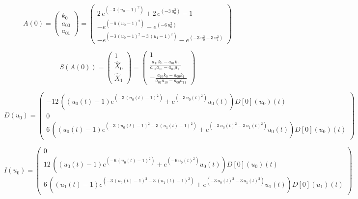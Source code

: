 \documentclass{article}
\begin{document}
\[
  A\left(0\right) = \left(\begin{array}{r}
k_{0} \\
a_{00} \\
a_{01}
\end{array}\right) = \left(\begin{array}{r}
2 \, e^{\left(-3 \, {\left(u_{0} - 1\right)}^{2}\right)} + 2 \, e^{\left(-3 \, u_{0}^{2}\right)} - 1 \\
-e^{\left(-6 \, {\left(u_{0} - 1\right)}^{2}\right)} - e^{\left(-6 \, u_{0}^{2}\right)} \\
-e^{\left(-3 \, {\left(u_{0} - 1\right)}^{2} - 3 \, {\left(u_{1} - 1\right)}^{2}\right)} - e^{\left(-3 \, u_{0}^{2} - 3 \, u_{1}^{2}\right)}
\end{array}\right)
\]

\[
  S\left(A\left(0\right)\right) = \left(\begin{array}{r}
1 \\
\hat{X}_{0} \\
\hat{X}_{1}
\end{array}\right) = \left(\begin{array}{r}
1 \\
\frac{a_{11} k_{0} - a_{01} k_{1}}{a_{01} a_{10} - a_{00} a_{11}} \\
-\frac{a_{10} k_{0} - a_{00} k_{1}}{a_{01} a_{10} - a_{00} a_{11}}
\end{array}\right)
\]

\[
  D(u_0) = \left(\begin{array}{r}
-12 \, {\left({\left(u_{0}\left(t\right) - 1\right)} e^{\left(-3 \, {\left(u_{0}\left(t\right) - 1\right)}^{2}\right)} + e^{\left(-3 \, u_{0}\left(t\right)^{2}\right)} u_{0}\left(t\right)\right)} D[0]\left(u_{0}\right)\left(t\right) \\
0 \\
6 \, {\left({\left(u_{0}\left(t\right) - 1\right)} e^{\left(-3 \, {\left(u_{0}\left(t\right) - 1\right)}^{2} - 3 \, {\left(u_{1}\left(t\right) - 1\right)}^{2}\right)} + e^{\left(-3 \, u_{0}\left(t\right)^{2} - 3 \, u_{1}\left(t\right)^{2}\right)} u_{0}\left(t\right)\right)} D[0]\left(u_{0}\right)\left(t\right)
\end{array}\right)
\]

\[
  I(u_0) = \left(\begin{array}{r}
0 \\
12 \, {\left({\left(u_{0}\left(t\right) - 1\right)} e^{\left(-6 \, {\left(u_{0}\left(t\right) - 1\right)}^{2}\right)} + e^{\left(-6 \, u_{0}\left(t\right)^{2}\right)} u_{0}\left(t\right)\right)} D[0]\left(u_{0}\right)\left(t\right) \\
6 \, {\left({\left(u_{1}\left(t\right) - 1\right)} e^{\left(-3 \, {\left(u_{0}\left(t\right) - 1\right)}^{2} - 3 \, {\left(u_{1}\left(t\right) - 1\right)}^{2}\right)} + e^{\left(-3 \, u_{0}\left(t\right)^{2} - 3 \, u_{1}\left(t\right)^{2}\right)} u_{1}\left(t\right)\right)} D[0]\left(u_{1}\right)\left(t\right)
\end{array}\right)
\]
\end{document}
